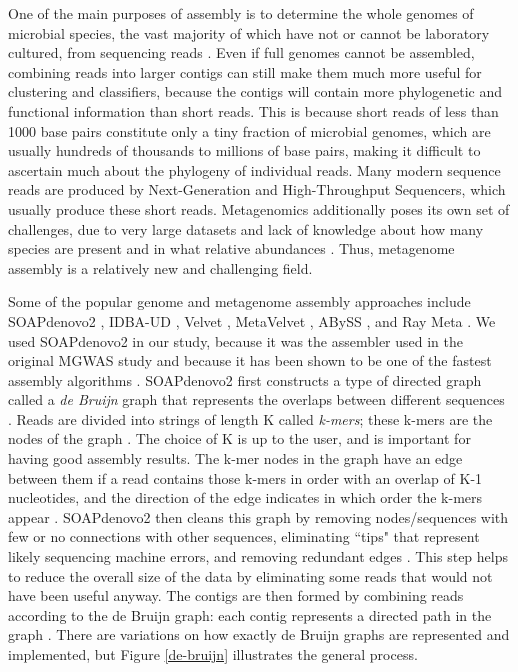 One of the main purposes of assembly is to determine the whole genomes of microbial species, the vast majority of which have not or cannot be laboratory cultured, from sequencing reads \cite{zerbino08}. Even if full genomes cannot be assembled, combining reads into larger contigs can still make them much more useful for clustering and classifiers, because the contigs will contain more phylogenetic and functional information than short reads. This is because short reads of less than 1000 base pairs constitute only a tiny fraction of microbial genomes, which are usually hundreds of thousands to millions of base pairs, making it difficult to ascertain much about the phylogeny of individual reads. Many modern sequence reads are produced by Next-Generation and High-Throughput Sequencers, which usually produce these short reads. Metagenomics additionally poses its own set of challenges, due to very large datasets and lack of knowledge about how many species are present and in what relative abundances \cite{namiki12}. Thus, metagenome assembly is a relatively new and challenging field.

Some of the popular genome and metagenome assembly approaches include SOAPdenovo2 \cite{luo12}, IDBA-UD \cite{peng12}, Velvet \cite{zerbino08}, MetaVelvet \cite{namiki12}, ABySS \cite{simpson09}, and Ray Meta \cite{boisvert12}. We used SOAPdenovo2 in our study, because it was the assembler used in the original MGWAS study \cite{qin041012} and because it has been shown to be one of the fastest assembly algorithms \cite{peng12}. SOAPdenovo2 first constructs a type of directed graph called a \emph{de Bruijn} graph that represents the overlaps between different sequences \cite{li10}. Reads are divided into strings of length K called \emph{k-mers}; these k-mers are the nodes of the graph \cite{zerbino08}. The choice of K is up to the user, and is important for having good assembly results. The k-mer nodes in the graph have an edge between them if a read contains those k-mers in order with an overlap of K-1 nucleotides, and the direction of the edge indicates in which order the k-mers appear \cite{zerbino08}. SOAPdenovo2 then cleans this graph by removing nodes/sequences with few or no connections with other sequences, eliminating ``tips" that represent likely sequencing machine errors, and removing redundant edges \cite{li10}. This step helps to reduce the overall size of the data by eliminating some reads that would not have been useful anyway. The contigs are then formed by combining reads according to the de Bruijn graph: each contig represents a directed path in the graph \cite{zerbino08}. There are variations on how exactly de Bruijn graphs are represented and implemented, but Figure \ref{de-bruijn} illustrates the general process.

